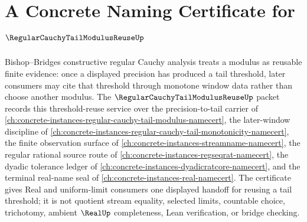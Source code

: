 \chapter{A Concrete Naming Certificate for $\RegularCauchyTailModulusReuseUp$}
\label{ch:concrete-instances-regular-cauchy-tail-modulus-reuse-namecert}

Bishop--Bridges constructive regular Cauchy analysis treats a modulus as reusable finite evidence: once a displayed precision has produced a tail threshold, later consumers may cite that threshold through monotone window data rather than choose another modulus. The $\RegularCauchyTailModulusReuseUp$ packet records this threshold-reuse service over the precision-to-tail carrier of \autoref{ch:concrete-instances-regular-cauchy-tail-modulus-namecert}, the later-window discipline of \autoref{ch:concrete-instances-regular-cauchy-tail-monotonicity-namecert}, the finite observation surface of \autoref{ch:concrete-instances-streamname-namecert}, the regular rational source route of \autoref{ch:concrete-instances-regseqrat-namecert}, the dyadic tolerance ledger of \autoref{ch:concrete-instances-dyadicratcore-namecert}, and the terminal real-name seal of \autoref{ch:concrete-instances-real-namecert}. The certificate gives Real and uniform-limit consumers one displayed handoff for reusing a tail threshold; it is not quotient stream equality, selected limits, countable choice, trichotomy, ambient $\RealUp$ completeness, Lean verification, or bridge checking.

